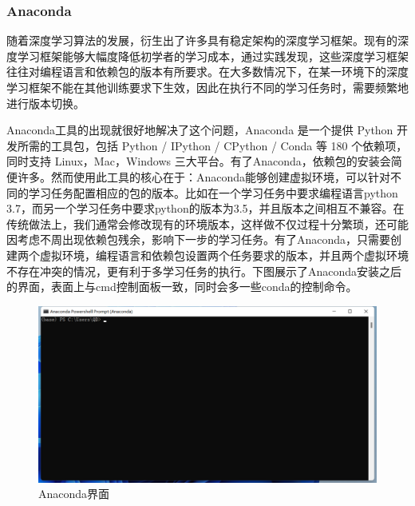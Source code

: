 \documentclass[a4paper]{article}
\begin{document}
  \subsubsection{Anaconda}
  随着深度学习算法的发展，衍生出了许多具有稳定架构的深度学习框架。现有的深度学习框架能够大幅度降低初学者的学习成本，通过实践发现，这些深度学习框架往往对编程语言和依赖包的版本有所要求。在大多数情况下，在某一环境下的深度学习框架不能在其他训练要求下生效，因此在执行不同的学习任务时，需要频繁地进行版本切换。\par
  Anaconda工具的出现就很好地解决了这个问题，Anaconda 是一个提供 Python 开发所需的工具包，包括 Python / IPython / CPython / Conda 等 180 个依赖项，同时支持 Linux，Mac，Windows 三大平台。有了Anaconda，依赖包的安装会简便许多。然而使用此工具的核心在于：Anaconda能够创建虚拟环境，可以针对不同的学习任务配置相应的包的版本。比如在一个学习任务中要求编程语言python 3.7，而另一个学习任务中要求python的版本为3.5，并且版本之间相互不兼容。在传统做法上，我们通常会修改现有的环境版本，这样做不仅过程十分繁琐，还可能因考虑不周出现依赖包残余，影响下一步的学习任务。有了Anaconda，只需要创建两个虚拟环境，编程语言和依赖包设置两个任务要求的版本，并且两个虚拟环境不存在冲突的情况，更有利于多学习任务的执行。下图展示了Anaconda安装之后的界面，表面上与cmd控制面板一致，同时会多一些conda的控制命令。\par
              \begin{figure}[H]
                \centering
                \includegraphics[width=16cm]{images/Anaconda.png}
                \caption{Anaconda界面}
                \label{fig1}
            \end{figure}
\end{document}
